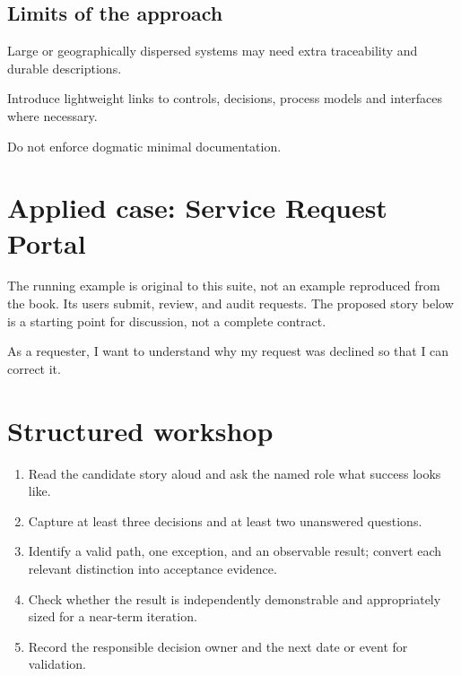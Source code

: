 \documentclass[11pt,letterpaper]{article}
\begin{document}
\subsection{Limits of the approach}
Large or geographically dispersed systems may need extra traceability and durable descriptions.

\begin{tcolorbox}[colback=tealback,colframe=navy,title={Engineering translation},breakable]
Introduce lightweight links to controls, decisions, process models and interfaces where necessary.

\end{tcolorbox}
\begin{tcolorbox}[colback=amberback,colframe=navy,title={Failure mode to watch},breakable]
Do not enforce dogmatic minimal documentation.

\end{tcolorbox}
\section{Applied case: Service Request Portal}
The running example is original to this suite, not an example reproduced from the book. Its users submit, review, and audit requests. The proposed story below is a starting point for discussion, not a complete contract.

\begin{tcolorbox}[colback=blueback,colframe=navy,title={Candidate story},breakable]
As a requester, I want to understand why my request was declined so that I can correct it.

\end{tcolorbox}
\section{Structured workshop}
\begin{enumerate}[leftmargin=*,itemsep=3pt]
\item Read the candidate story aloud and ask the named role what success looks like.
\item Capture at least three decisions and at least two unanswered questions.
\item Identify a valid path, one exception, and an observable result; convert each relevant distinction into acceptance evidence.
\item Check whether the result is independently demonstrable and appropriately sized for a near-term iteration.
\item Record the responsible decision owner and the next date or event for validation.
\end{enumerate}
\end{document}
